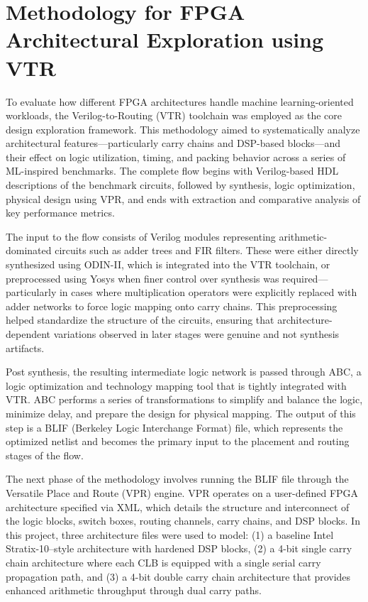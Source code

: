 \section{Methodology for FPGA Architectural Exploration using VTR}
To evaluate how different FPGA architectures handle machine learning-oriented workloads, the Verilog-to-Routing (VTR) toolchain was employed as the core design exploration framework. This methodology aimed to systematically analyze architectural features—particularly carry chains and DSP-based blocks—and their effect on logic utilization, timing, and packing behavior across a series of ML-inspired benchmarks. The complete flow begins with Verilog-based HDL descriptions of the benchmark circuits, followed by synthesis, logic optimization, physical design using VPR, and ends with extraction and comparative analysis of key performance metrics.

The input to the flow consists of Verilog modules representing arithmetic-dominated circuits such as adder trees and FIR filters. These were either directly synthesized using ODIN-II, which is integrated into the VTR toolchain, or preprocessed using Yosys when finer control over synthesis was required—particularly in cases where multiplication operators were explicitly replaced with adder networks to force logic mapping onto carry chains. This preprocessing helped standardize the structure of the circuits, ensuring that architecture-dependent variations observed in later stages were genuine and not synthesis artifacts.

Post synthesis, the resulting intermediate logic network is passed through ABC, a logic optimization and technology mapping tool that is tightly integrated with VTR. ABC performs a series of transformations to simplify and balance the logic, minimize delay, and prepare the design for physical mapping. The output of this step is a BLIF (Berkeley Logic Interchange Format) file, which represents the optimized netlist and becomes the primary input to the placement and routing stages of the flow.

The next phase of the methodology involves running the BLIF file through the Versatile Place and Route (VPR) engine. VPR operates on a user-defined FPGA architecture specified via XML, which details the structure and interconnect of the logic blocks, switch boxes, routing channels, carry chains, and DSP blocks. In this project, three architecture files were used to model: (1) a baseline Intel Stratix-10–style architecture with hardened DSP blocks, (2) a 4-bit single carry chain architecture where each CLB is equipped with a single serial carry propagation path, and (3) a 4-bit double carry chain architecture that provides enhanced arithmetic throughput through dual carry paths.

